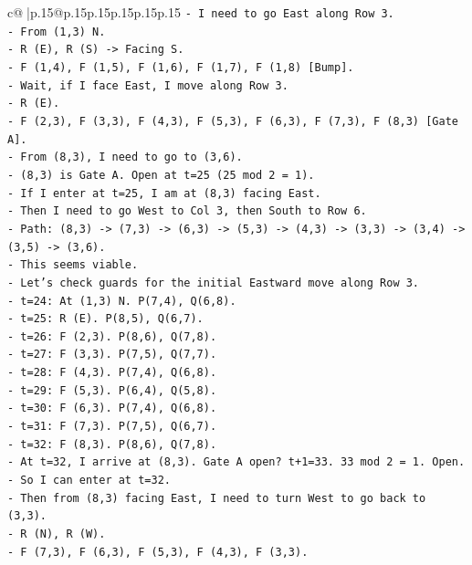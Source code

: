 \documentclass{article}
\begin{document}
{\begin{supertabular}{c@{$\;$}|p{.15\linewidth}@{}p{.15\linewidth}p{.15\linewidth}p{.15\linewidth}p{.15\linewidth}p{.15\linewidth}}
{{{\texttt{{-} I need to go East along Row 3.} \\
\texttt{{-} From (1,3) N.} \\
\texttt{{-} R (E), R (S) {-}> Facing S.} \\
\texttt{{-} F (1,4), F (1,5), F (1,6), F (1,7), F (1,8) {[}Bump{]}.} \\
\texttt{{-} Wait, if I face East, I move along Row 3.} \\
\texttt{{-} R (E).} \\
\texttt{{-} F (2,3), F (3,3), F (4,3), F (5,3), F (6,3), F (7,3), F (8,3) {[}Gate A{]}.} \\
\texttt{{-} From (8,3), I need to go to (3,6).} \\
\texttt{{-} (8,3) is Gate A. Open at t=25 (25 mod 2 = 1).} \\
\texttt{{-} If I enter at t=25, I am at (8,3) facing East.} \\
\texttt{{-} Then I need to go West to Col 3, then South to Row 6.} \\
\texttt{{-} Path: (8,3) {-}> (7,3) {-}> (6,3) {-}> (5,3) {-}> (4,3) {-}> (3,3) {-}> (3,4) {-}> (3,5) {-}> (3,6).} \\
\texttt{{-} This seems viable.} \\
\texttt{{-} Let's check guards for the initial Eastward move along Row 3.} \\
\texttt{{-} t=24: At (1,3) N. P(7,4), Q(6,8).} \\
\texttt{{-} t=25: R (E). P(8,5), Q(6,7).} \\
\texttt{{-} t=26: F (2,3). P(8,6), Q(7,8).} \\
\texttt{{-} t=27: F (3,3). P(7,5), Q(7,7).} \\
\texttt{{-} t=28: F (4,3). P(7,4), Q(6,8).} \\
\texttt{{-} t=29: F (5,3). P(6,4), Q(5,8).} \\
\texttt{{-} t=30: F (6,3). P(7,4), Q(6,8).} \\
\texttt{{-} t=31: F (7,3). P(7,5), Q(6,7).} \\
\texttt{{-} t=32: F (8,3). P(8,6), Q(7,8).} \\
\texttt{{-} At t=32, I arrive at (8,3). Gate A open? t+1=33. 33 mod 2 = 1. Open.} \\
\texttt{{-} So I can enter at t=32.} \\
\texttt{{-} Then from (8,3) facing East, I need to turn West to go back to (3,3).} \\
\texttt{{-} R (N), R (W).} \\
\texttt{{-} F (7,3), F (6,3), F (5,3), F (4,3), F (3,3).} \\
}}}
\end{supertabular}}
\end{document}

